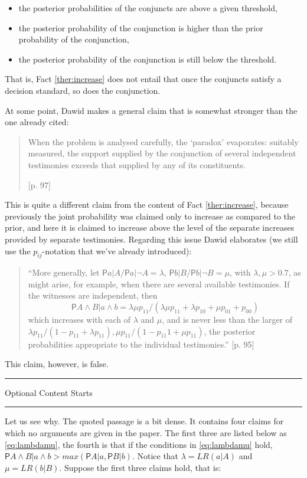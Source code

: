 \documentclass[10pt,dvipsnames,enabledeprecatedfontcommands]{scrartcl}
\newcommand{\n}{\neg}
\newcommand{\et}{\wedge}
\newcommand{\pr}{\mathsf{P}}
\newcommand{\intermezzoa}{
	\begin{minipage}[c]{13cm}
	\begin{center}\rule{10cm}{0.4pt}



	\tiny{\sc Optional Content Starts}
	
	\vspace{-1mm}
	
	\rule{10cm}{0.4pt}\end{center}
	\end{minipage}\nopagebreak 
	}
\begin{document}
\begin{itemize}
\item  the posterior probabilities of the conjuncts are above a given threshold,
\item   the posterior probability of the conjunction is higher than the prior probability of the conjunction,
\item   the posterior probability of the conjunction 
 is still below the threshold.
\end{itemize}

That is, Fact \ref{ther:increase} does not entail that once the
conjuncts satisfy a decision standard, so does the conjunction.

At some point, Dawid makes a general claim that is somewhat stronger
than the one already cited:

\begin{quote} When the problem is analysed carefully, the `paradox' evaporates: suitably measured, the support supplied by the conjunction of several independent testimonies exceeds that supplied by any of its constituents.

  [p. 97]\end{quote}

This is quite a different claim from the content of Fact
\ref{ther:increase}, because previously the joint probability was
claimed only to increase as compared to the prior, and here it is
claimed to increase above the level of the separate increases provided
by separate testimonies. Regarding this issue Dawid elaborates (we still
use the \(p_{ij}\)-notation that we've already introduced):

\begin{quote}
 ``More generally, let $\pr{a\vert A}/\pr{a\vert \n A}=\lambda$, $\pr{b\vert B}/\pr{b\vert \n B}=\mu$, with $\lambda, \mu >0.7$, as might arise, for example, when there are several available testimonies. If the witnesses are
  independent, then \[\pr{A\et B\vert  a\et b} = \lambda \mu p_{11}/(\lambda \mu p_{11} + \lambda p_{10} +\mu p_{01} + p_{00})\] which  increases with
 each of $\lambda$ and $\mu$, and is never less than the larger of $\lambda p_{11}/(1-p_{11}+\lambda p_{11}),
 \mu p_{11} /(1- p_{11} 1 + \mu p_{11})$, the posterior probabilities appropriate to the individual testimonies.'' [p. 95]
 \end{quote}

This claim, however, is false.

\intermezzoa

Let us see why. The quoted passage is a bit dense. It contains four
claims for which no arguments are given in the paper. The first three
are listed below as \eqref{eq:lambdamu}, the fourth is that if the
conditions in \eqref{eq:lambdamu} hold,
\(\pr{A\et B\vert a\et b}>max(\pr{A\vert a},\pr{B\vert b})\). Notice
that \(\lambda=LR(a\vert A)\) and \(\mu=LR(b\vert B)\). Suppose the
first three claims hold, that is:
\end{document}
